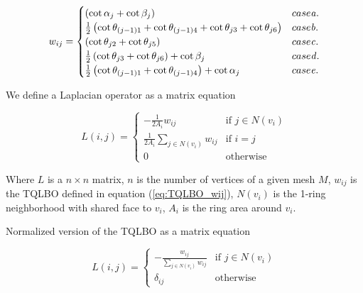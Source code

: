 \documentclass[10pt, conference]{IEEEtran}
\begin{document}
{\small 
\begin{equation}
w_{ij}=\begin{cases}
\left(\cot\alpha_{j}+\cot\beta_{j}\right) & \mbox{case }\mathit{a.}\\
\frac{1}{2}\left(\cot\theta_{\left(j-1\right)1}+\cot\theta_{\left(j-1\right)4}+\cot\theta_{j3}+\cot\theta_{j6}\right) & \mbox{case \ensuremath{\mathit{b}}.}\\
\left(\cot\theta_{j2}+\cot\theta_{j5}\right) & \mbox{case \ensuremath{\mathit{c}}.}\\
\frac{1}{2}\left(\cot\theta_{j3}+\cot\theta_{j6}\right)+\cot\beta_{j} & \mbox{case \ensuremath{\mathit{d}}.}\\
\frac{1}{2}\left(\cot\theta_{\left(j-1\right)1}+\cot\theta_{\left(j-1\right)4}\right)+\cot\alpha_{j} & \mbox{case \ensuremath{\mathit{e}}.}
\end{cases}\label{eq:TQLBO_wij}
\end{equation}
}{\small \par}

We define a Laplacian operator as a matrix equation

\begin{equation}
L\left(i,j\right)=\begin{cases}
-\frac{1}{2A_{i}}w_{ij} & \mbox{if }j\in N\left(v_{i}\right)\\
\frac{1}{2A_{i}}\underset{j\in N\left(v_{i}\right)}{\sum}w_{ij} & \mbox{if }i=j\\
0 & \mbox{otherwise}
\end{cases}\label{eq:TQLBO_Simple_Matrix}
\end{equation}


Where $L$ is a $n\times n$ matrix, $n$ is the number of vertices
of a given mesh $M$, $w_{ij}$ is the TQLBO defined in equation (\ref{eq:TQLBO_wij}),
$N\left(v_{i}\right)$ is the 1-ring neighborhood with shared face
to $v_{i}$, $A_{i}$ is the ring area around $v_{i}$.

Normalized version of the TQLBO as a matrix equation

\begin{equation}
L\left(i,j\right)=\begin{cases}
-\frac{w_{ij}}{\underset{j\in N\left(v_{i}\right)}{\sum}w_{ij}} & \mbox{if }j\in N\left(v_{i}\right)\\
\delta_{ij} & \mbox{otherwise}
\end{cases}\label{eq:TQLBO-Normalized_Matrix}
\end{equation}
\end{document}
